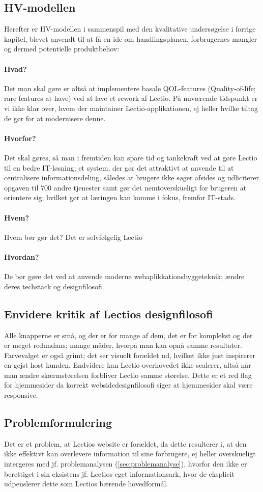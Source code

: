 \subsection{HV-modellen}
Herefter er HV-modellen i sammenspil med den kvalitative undersøgelse i forrige kapitel, blevet anvendt til at få en ide om handlingsplanen, forbrugernes mangler og dermed potentielle produktbehov:
\paragraph{Hvad?}
    Det man skal gøre er altså at implementere basale QOL-features (Quality-of-life; rare features at have) ved at lave et rework af Lectio. På nuværende tidspunkt er vi ikke klar over, hvem der maintainer Lectio-applikationen, ej heller hvilke tiltag de gør for at modernisere denne.
\paragraph{Hvorfor?}
    Det skal gøres, så man i fremtiden kan spare tid og tankekraft ved at gøre Lectio til en bedre IT-løsning; et system, der gør det attraktivt at anvende til at centralisere informationsdeling, således at brugere ikke søger afsides og udliciterer opgaven til 700 andre tjenester samt gør det nemtoverskueligt for brugeren at orientere sig; hvilket gør at læringen kan komme i fokus, fremfor IT-stads. 
\paragraph{Hvem?}
    Hvem bør gør det? Det er selvfølgelig Lectio
\paragraph{Hvordan?}
    De bør gøre det ved at anvende moderne webaplikkationsbyggeteknik; ændre deres techstack og designfilosofi.

\subsection{Envidere kritik af Lectios designfilosofi}
    Alle knapperne er små, og der er for mange af dem, det er for komplekst og der er meget redundans; mange måder, hvorpå man kan opnå samme resultater. 
    Farvevalget er også grimt; det ser visuelt forældet ud, hvilket ikke just inspirerer en gejst host kunden.
    Endvidere kan Lectio overhovedet ikke scalerer, altså når man ændre skærmstørelsen forbliver Lectio samme størelse. Dette er et red flag for hjemmesider da korrekt websidedesignfilosofi
    siger at hjemmesider skal være responsive.

\subsection{Problemformulering \label{sec:problemformulering}}
    Det er et problem, at Lectios website er forældet, da dette resulterer i, at den ikke effektivt kan overlevere information til sine forbrugere, ej heller overskueligt intergeres med jf. problemanalysen (\ref{sec:problemanalyse}), hvorfor den ikke er berettiget i sin eksistens jf. Lectios eget informationsark, hvor de eksplicit udpenslerer dette som Lectios bærende hovedformål\cite{lectioark}.